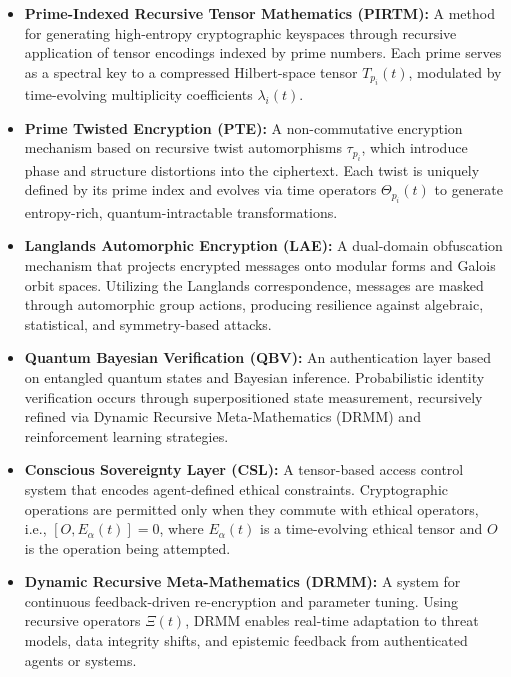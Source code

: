 \documentclass{article}
\theoremstyle{plain}
\begin{document}
\begin{itemize}
  \item \textbf{Prime-Indexed Recursive Tensor Mathematics (PIRTM):} A method for generating high-entropy cryptographic keyspaces through recursive application of tensor encodings indexed by prime numbers. Each prime serves as a spectral key to a compressed Hilbert-space tensor $T_{p_i}(t)$, modulated by time-evolving multiplicity coefficients $\lambda_i(t)$.

  \item \textbf{Prime Twisted Encryption (PTE):} A non-commutative encryption mechanism based on recursive twist automorphisms $\tau_{p_i}$, which introduce phase and structure distortions into the ciphertext. Each twist is uniquely defined by its prime index and evolves via time operators $\Theta_{p_i}(t)$ to generate entropy-rich, quantum-intractable transformations.

  \item \textbf{Langlands Automorphic Encryption (LAE):} A dual-domain obfuscation mechanism that projects encrypted messages onto modular forms and Galois orbit spaces. Utilizing the Langlands correspondence, messages are masked through automorphic group actions, producing resilience against algebraic, statistical, and symmetry-based attacks.

  \item \textbf{Quantum Bayesian Verification (QBV):} An authentication layer based on entangled quantum states and Bayesian inference. Probabilistic identity verification occurs through superpositioned state measurement, recursively refined via Dynamic Recursive Meta-Mathematics (DRMM) and reinforcement learning strategies.

  \item \textbf{Conscious Sovereignty Layer (CSL):} A tensor-based access control system that encodes agent-defined ethical constraints. Cryptographic operations are permitted only when they commute with ethical operators, i.e., $[O, E_\alpha(t)] = 0$, where $E_\alpha(t)$ is a time-evolving ethical tensor and $O$ is the operation being attempted.

  \item \textbf{Dynamic Recursive Meta-Mathematics (DRMM):} A system for continuous feedback-driven re-encryption and parameter tuning. Using recursive operators $\Xi(t)$, DRMM enables real-time adaptation to threat models, data integrity shifts, and epistemic feedback from authenticated agents or systems.


\end{itemize}
\end{document}
